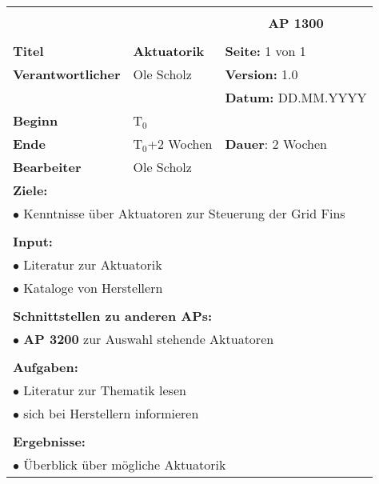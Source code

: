\clearpage
\begin{table}[!h]
	\begin{center}
		\begin{tabular}{|p{35mm}||p{55mm}|p{50mm}||p{40mm}|}
			\hline
			\multicolumn{3}{|l||}{\textbf{}} & \multicolumn{1}{c|}{}\\
			\multicolumn{3}{|l||}{\textbf{}} & \multicolumn{1}{c|}{\textbf{AP 1300}}\\
			\multicolumn{3}{|l||}{\textbf{}} & \multicolumn{1}{c|}{}\\
			\hline\hline
			\textbf{Titel} & \multicolumn{2}{p{7cm}||}{\textbf{Aktuatorik}} 
			& \textbf{Seite:} 1 von 1\\
			\hline
			\textbf{Verantwortlicher} & \multicolumn{2}{l||}{Ole Scholz} & \textbf{Version:} 1.0\\
			\hline
			\multicolumn{3}{|l||}{} & \textbf{Datum:} DD.MM.YYYY\\
			\hline\hline
			\textbf{Beginn} & \multicolumn{2}{l||}{T$_0$} & \\
			\hline
			\textbf{Ende} & \multicolumn{2}{l||}{T$_0$+2 Wochen} & \textbf{Dauer}: 2 Wochen\\
			\hline\hline
			\textbf{Bearbeiter} & \multicolumn{3}{l|}{Ole Scholz}\\
			\hline\hline
			\multicolumn{4}{|p{150mm}|}{\textbf{Ziele:}}\\
			\multicolumn{4}{|p{150mm}|}{$\bullet$ Kenntnisse über Aktuatoren zur Steuerung der Grid Fins}\\
			\multicolumn{4}{|p{150mm}|}{}\\
			\multicolumn{4}{|p{150mm}|}{\textbf{Input:}}\\
			\multicolumn{4}{|p{150mm}|}{$\bullet$ Literatur zur Aktuatorik}\\
			\multicolumn{4}{|p{150mm}|}{$\bullet$ Kataloge von Herstellern}\\
			\multicolumn{4}{|p{150mm}|}{}\\
			\multicolumn{4}{|p{150mm}|}{\textbf{Schnittstellen zu anderen APs:}}\\
			\multicolumn{4}{|p{150mm}|}{$\bullet$ \textbf{AP 3200} zur Auswahl stehende Aktuatoren}\\
			\multicolumn{4}{|p{150mm}|}{}\\
			\multicolumn{4}{|p{150mm}|}{\textbf{Aufgaben:}}\\
			\multicolumn{4}{|p{150mm}|}{$\bullet$ Literatur zur Thematik lesen}\\
			\multicolumn{4}{|p{150mm}|}{$\bullet$ sich bei Herstellern informieren}\\
			\multicolumn{4}{|p{150mm}|}{}\\
			\multicolumn{4}{|p{150mm}|}{\textbf{Ergebnisse:}}\\
			\multicolumn{4}{|p{150mm}|}{$\bullet$ Überblick über mögliche Aktuatorik}\\
			\hline
		\end{tabular}
	\end{center}
\end{table}

